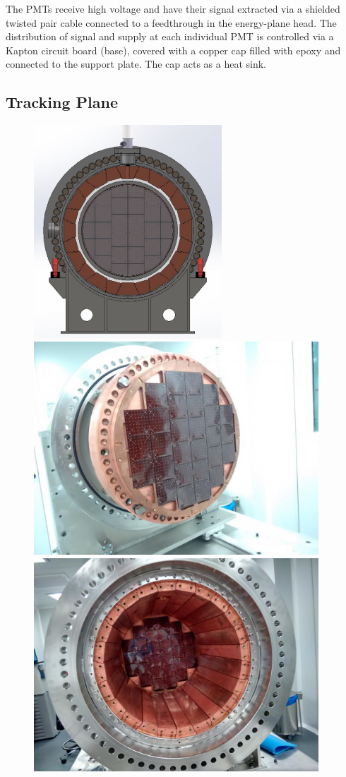The PMTs receive high voltage and have their signal extracted via a
shielded twisted pair cable connected to a feedthrough in the energy-plane head. The distribution of
signal and supply at each individual PMT is controlled via a
Kapton circuit board (base), covered with a
copper cap filled with epoxy and connected to the support plate. The cap acts as a heat sink.


\subsection{Tracking Plane}

\begin{figure}[hpt!]
\centering
\includegraphics[height=8cm]{img/TrackingPlane.jpg}
\includegraphics[height=8cm]{img/TPI1.png}
\includegraphics[height=8cm]{img/TrackingPlaneFromEP.png}


\end{figure}
